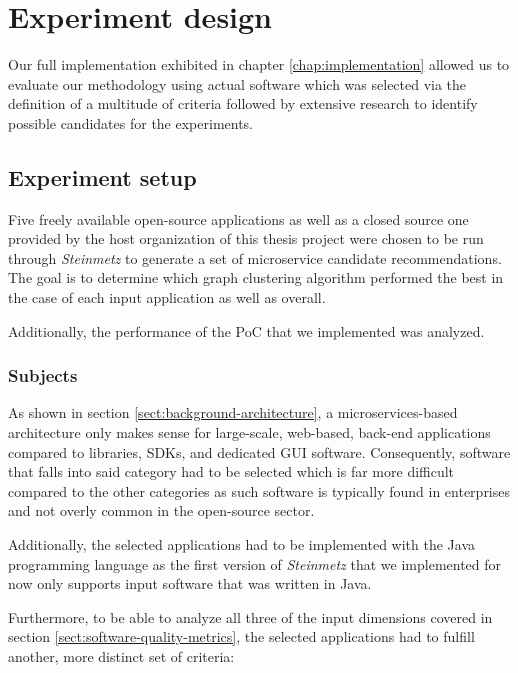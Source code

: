 \documentclass[12pt,a4paper]{report}
\begin{document}
\chapter{Experiment design} \label{chap:experiment-design}

Our full implementation exhibited in chapter \ref{chap:implementation} allowed us
to evaluate our methodology using actual software which was selected via the
definition of a multitude of criteria followed by extensive research to identify
possible candidates for the experiments.



\section{Experiment setup}

Five freely available open-source applications as well as a closed source one
provided by the host organization of this thesis project were chosen to be run through
\textit{Steinmetz} to generate a set of microservice candidate recommendations.
The goal is to determine which graph clustering algorithm performed the best in the case
of each input application as well as overall.

Additionally, the performance of the PoC that we implemented was analyzed.


\subsection{Subjects}

As shown in section \ref{sect:background-architecture}, a microservices\hyp based
architecture only makes sense for large\hyp scale, web\hyp based, back\hyp end
applications compared to libraries, SDKs, and dedicated GUI software.
Consequently, software that falls into said category had to be selected which
is far more difficult compared to the other categories as such software is
typically found in enterprises and not overly common in the open-source sector.

Additionally, the selected applications had to be implemented with the Java
programming language as the first version of \textit{Steinmetz} that we implemented
for now only supports input software that was written in Java.

Furthermore, to be able to analyze all three of the input dimensions covered in
section \ref{sect:software-quality-metrics}, the selected applications had to fulfill
another, more distinct set of criteria:
\end{document}
